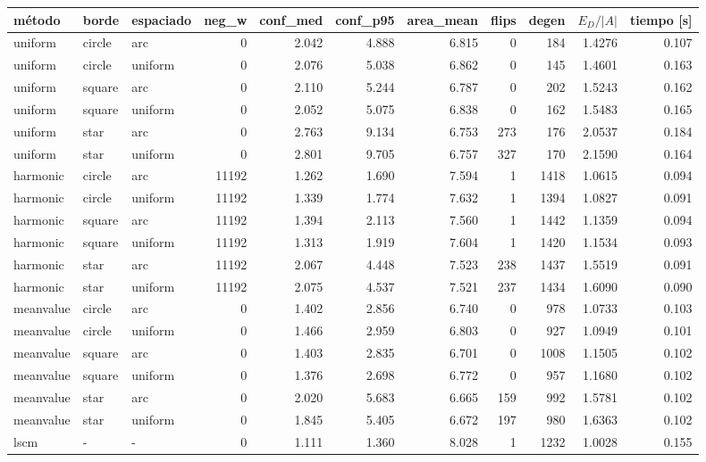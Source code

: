 \begin{tabular}{lllrrrrrrrr}
\toprule
método & borde & espaciado & neg\_w & conf\_med & conf\_p95 & area\_mean & flips & degen & $E_D/|A|$ & tiempo [s] \\
\midrule
uniform & circle & arc & 0 & 2.042 & 4.888 & 6.815 & 0 & 184 & 1.4276 & 0.107 \\
uniform & circle & uniform & 0 & 2.076 & 5.038 & 6.862 & 0 & 145 & 1.4601 & 0.163 \\
uniform & square & arc & 0 & 2.110 & 5.244 & 6.787 & 0 & 202 & 1.5243 & 0.162 \\
uniform & square & uniform & 0 & 2.052 & 5.075 & 6.838 & 0 & 162 & 1.5483 & 0.165 \\
uniform & star & arc & 0 & 2.763 & 9.134 & 6.753 & 273 & 176 & 2.0537 & 0.184 \\
uniform & star & uniform & 0 & 2.801 & 9.705 & 6.757 & 327 & 170 & 2.1590 & 0.164 \\
\midrule
harmonic & circle & arc & 11192 & 1.262 & 1.690 & 7.594 & 1 & 1418 & 1.0615 & 0.094 \\
harmonic & circle & uniform & 11192 & 1.339 & 1.774 & 7.632 & 1 & 1394 & 1.0827 & 0.091 \\
harmonic & square & arc & 11192 & 1.394 & 2.113 & 7.560 & 1 & 1442 & 1.1359 & 0.094 \\
harmonic & square & uniform & 11192 & 1.313 & 1.919 & 7.604 & 1 & 1420 & 1.1534 & 0.093 \\
harmonic & star & arc & 11192 & 2.067 & 4.448 & 7.523 & 238 & 1437 & 1.5519 & 0.091 \\
harmonic & star & uniform & 11192 & 2.075 & 4.537 & 7.521 & 237 & 1434 & 1.6090 & 0.090 \\
\midrule
meanvalue & circle & arc & 0 & 1.402 & 2.856 & 6.740 & 0 & 978 & 1.0733 & 0.103 \\
meanvalue & circle & uniform & 0 & 1.466 & 2.959 & 6.803 & 0 & 927 & 1.0949 & 0.101 \\
meanvalue & square & arc & 0 & 1.403 & 2.835 & 6.701 & 0 & 1008 & 1.1505 & 0.102 \\
meanvalue & square & uniform & 0 & 1.376 & 2.698 & 6.772 & 0 & 957 & 1.1680 & 0.102 \\
meanvalue & star & arc & 0 & 2.020 & 5.683 & 6.665 & 159 & 992 & 1.5781 & 0.102 \\
meanvalue & star & uniform & 0 & 1.845 & 5.405 & 6.672 & 197 & 980 & 1.6363 & 0.102 \\
\midrule
lscm & - & - & 0 & 1.111 & 1.360 & 8.028 & 1 & 1232 & 1.0028 & 0.155 \\
\bottomrule
\end{tabular}
